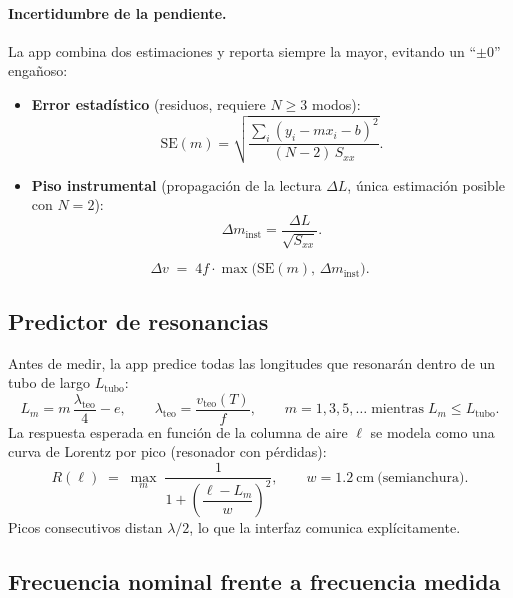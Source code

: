 \documentclass[11pt,a4paper]{article}
\newcommand{\vteo}{v_{\text{teo}}}
\begin{document}
\paragraph{Incertidumbre de la pendiente.} La app combina dos estimaciones y reporta siempre
la mayor, evitando un ``$\pm 0$'' engañoso:
\begin{itemize}[nosep]
  \item \textbf{Error estadístico} (residuos, requiere $N \ge 3$ modos):
  \begin{equation}
    \mathrm{SE}(m) = \sqrt{\dfrac{\sum_i (y_i - m x_i - b)^2}{(N-2)\,S_{xx}}} .
  \end{equation}
  \item \textbf{Piso instrumental} (propagación de la lectura $\Delta L$, única estimación
  posible con $N = 2$):
  \begin{equation}
    \Delta m_{\text{inst}} = \frac{\Delta L}{\sqrt{S_{xx}}} .
  \end{equation}
\end{itemize}
\begin{equation}
  \Delta v \;=\; 4 f \cdot \max\!\bigl(\mathrm{SE}(m),\, \Delta m_{\text{inst}}\bigr) .
\end{equation}

\subsection{Predictor de resonancias}

Antes de medir, la app predice todas las longitudes que resonarán dentro de un tubo de largo
$L_{\text{tubo}}$:
\begin{equation}
  L_m = m\,\frac{\lambda_{\text{teo}}}{4} - e,
  \qquad \lambda_{\text{teo}} = \frac{\vteo(T)}{f},
  \qquad m = 1, 3, 5, \dots \;\text{mientras}\; L_m \le L_{\text{tubo}} .
\end{equation}
La respuesta esperada en función de la columna de aire $\ell$ se modela como una curva de
Lorentz por pico (resonador con pérdidas):
\begin{equation}
  R(\ell) \;=\; \max_m \; \frac{1}{1 + \left(\dfrac{\ell - L_m}{w}\right)^{2}},
  \qquad w = \SI{1.2}{\centi\metre}\ \text{(semianchura)} .
  \label{eq:lorentz}
\end{equation}
Picos consecutivos distan $\lambda/2$, lo que la interfaz comunica explícitamente.

\subsection{Frecuencia nominal frente a frecuencia medida}
\end{document}
